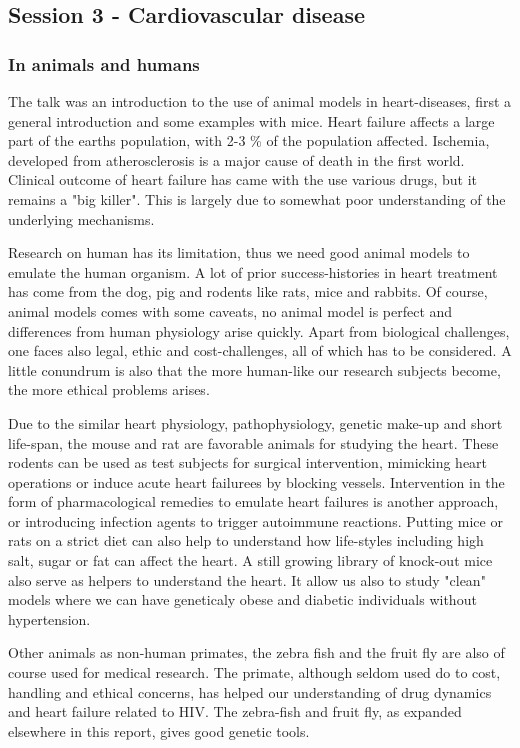 \documentclass[12p]{article}
\begin{document}
\subsection*{Session 3 - Cardiovascular disease}

\subsubsection{In animals and humans}

The talk was an introduction to the use of animal models in heart-diseases, first a general introduction and some examples with mice.
Heart failure affects a large part of the earths population, with 2-3 \% of the population affected.
Ischemia, developed from atherosclerosis is a major cause of death in the first world.
Clinical outcome of heart failure has came with the use various drugs, but it remains a "big killer".
This is largely due to somewhat poor understanding of the underlying mechanisms.

Research on human has its limitation, thus we need good animal models to emulate the human organism.
A lot of prior success-histories in heart treatment has come from the dog, pig and rodents like rats, mice and rabbits.
Of course, animal models comes with some caveats, no animal model is perfect and differences from human physiology arise quickly.
Apart from biological challenges, one faces also legal, ethic and cost-challenges, all of which has to be considered.
A little conundrum is also that the more human-like our research subjects become, the more ethical problems arises.

Due to the similar heart physiology, pathophysiology, genetic make-up and short life-span, the mouse and rat are favorable animals for studying the heart.
These rodents can be used as test subjects for surgical intervention, mimicking heart operations or induce acute heart failurees by blocking vessels.
Intervention in the form of pharmacological remedies to emulate heart failures is another approach, or introducing infection agents to trigger autoimmune reactions.
Putting mice or rats on a strict diet can also help to understand how life-styles including high salt, sugar or fat can affect the heart.
A still growing library of knock-out mice also serve as helpers to understand the heart.
It allow us also to study "clean" models where we can have geneticaly obese and diabetic individuals without hypertension.

Other animals as non-human primates, the zebra fish and the fruit fly are also of course used for medical research.
The primate, although seldom used do to cost, handling and ethical concerns, has helped our understanding of drug dynamics and heart failure related to HIV.
The zebra-fish and fruit fly, as expanded elsewhere in this report, gives good genetic tools.
\end{document}
